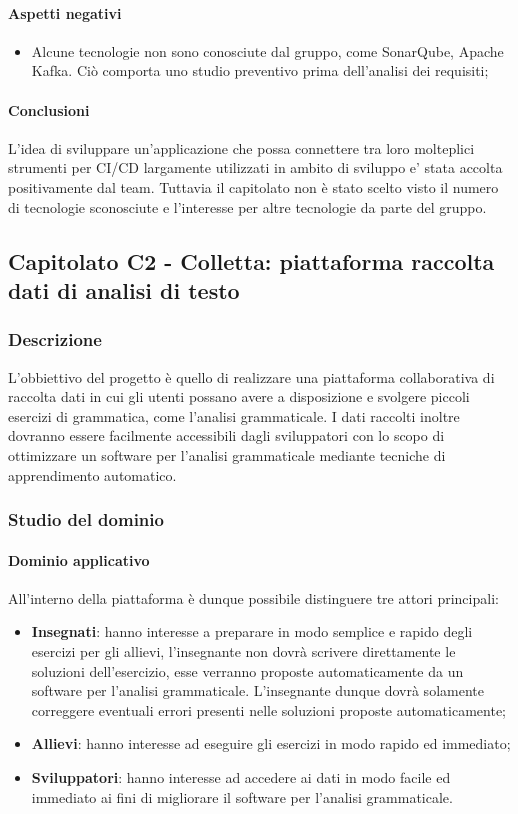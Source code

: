 			\paragraph{Aspetti negativi}
			\begin{itemize}
				\item {Alcune tecnologie non sono conosciute dal gruppo, come SonarQube, Apache Kafka. Ciò comporta uno studio preventivo prima dell'analisi dei requisiti;}
			\end{itemize} 
			\paragraph{Conclusioni} \Spazio
			L'idea di sviluppare un'applicazione che possa connettere tra loro molteplici strumenti per CI/CD largamente utilizzati in ambito di sviluppo e' stata accolta positivamente dal team. Tuttavia il capitolato non è stato scelto visto il numero di tecnologie sconosciute e l'interesse per altre tecnologie da parte del gruppo.
			
	\subsection{Capitolato C2 - Colletta: piattaforma raccolta dati di analisi di testo}
	\subsubsection{Descrizione}
	L'obbiettivo del progetto è quello di realizzare una piattaforma collaborativa di raccolta dati in cui gli utenti possano avere a disposizione e svolgere piccoli esercizi di grammatica, come l'analisi grammaticale.
	I dati raccolti inoltre dovranno essere facilmente accessibili dagli sviluppatori con lo scopo di ottimizzare un software per l'analisi grammaticale mediante tecniche di apprendimento automatico.   
	\subsubsection{Studio del dominio}
	\paragraph{Dominio applicativo} \Spazio
	All'interno della piattaforma è dunque possibile distinguere tre attori principali:
	\begin{itemize} 
	\item \textbf{Insegnati}: hanno interesse a preparare in modo semplice e rapido degli esercizi per gli allievi, l'insegnante non dovrà scrivere direttamente le soluzioni dell'esercizio, esse verranno proposte automaticamente da un software per
	l'analisi grammaticale. L'insegnante dunque dovrà solamente correggere eventuali errori presenti nelle soluzioni proposte automaticamente;
	\item \textbf{Allievi}: hanno interesse ad eseguire gli esercizi in modo rapido ed immediato;
	\item \textbf{Sviluppatori}: hanno interesse ad accedere ai dati in modo facile ed immediato ai fini di migliorare il software per l'analisi grammaticale.
	\end{itemize}
